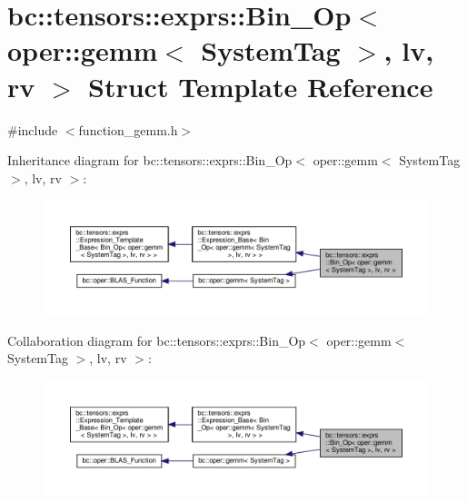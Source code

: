 \hypertarget{structbc_1_1tensors_1_1exprs_1_1Bin__Op_3_01oper_1_1gemm_3_01SystemTag_01_4_00_01lv_00_01rv_01_4}{}\section{bc\+:\+:tensors\+:\+:exprs\+:\+:Bin\+\_\+\+Op$<$ oper\+:\+:gemm$<$ System\+Tag $>$, lv, rv $>$ Struct Template Reference}
\label{structbc_1_1tensors_1_1exprs_1_1Bin__Op_3_01oper_1_1gemm_3_01SystemTag_01_4_00_01lv_00_01rv_01_4}


{\ttfamily \#include $<$function\+\_\+gemm.\+h$>$}



Inheritance diagram for bc\+:\+:tensors\+:\+:exprs\+:\+:Bin\+\_\+\+Op$<$ oper\+:\+:gemm$<$ System\+Tag $>$, lv, rv $>$\+:\nopagebreak
\begin{figure}[H]
\begin{center}
\leavevmode
\includegraphics[width=350pt]{structbc_1_1tensors_1_1exprs_1_1Bin__Op_3_01oper_1_1gemm_3_01SystemTag_01_4_00_01lv_00_01rv_01_4__inherit__graph}
\end{center}
\end{figure}


Collaboration diagram for bc\+:\+:tensors\+:\+:exprs\+:\+:Bin\+\_\+\+Op$<$ oper\+:\+:gemm$<$ System\+Tag $>$, lv, rv $>$\+:\nopagebreak
\begin{figure}[H]
\begin{center}
\leavevmode
\includegraphics[width=350pt]{structbc_1_1tensors_1_1exprs_1_1Bin__Op_3_01oper_1_1gemm_3_01SystemTag_01_4_00_01lv_00_01rv_01_4__coll__graph}
\end{center}
\end{figure}
